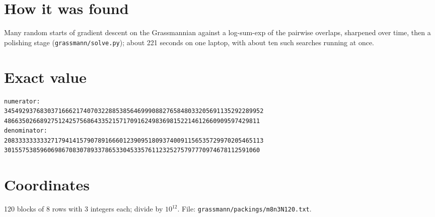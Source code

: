 \documentclass[11pt,a4paper]{article}
\begin{document}
\section{How it was found}
Many random starts of gradient descent on the Grassmannian against a log-sum-exp of the pairwise overlaps, sharpened over time, then a polishing stage (\texttt{grassmann/solve.py}); about 221 seconds on one laptop, with about ten such searches running at once.


\appendix
\section{Exact value}
{\small
\begin{verbatim}
numerator:
345492937683037166621740703228853856469990882765848033205691135292289952
48663502668927512425756864335215717091624983698152214612660909597429811
denominator:
208333333333271794141579078916660123909518093740091156535729970205465113
30155753859606986708307893378653304533576112325275797770974678112591060
\end{verbatim}}

\section{Coordinates}
120 blocks of 8 rows with 3 integers each; divide by $10^{12}$. File: \texttt{grassmann/packings/m8n3N120.txt}.
{\tiny
\begin{multicols}{3}
\end{multicols}}
\end{document}
